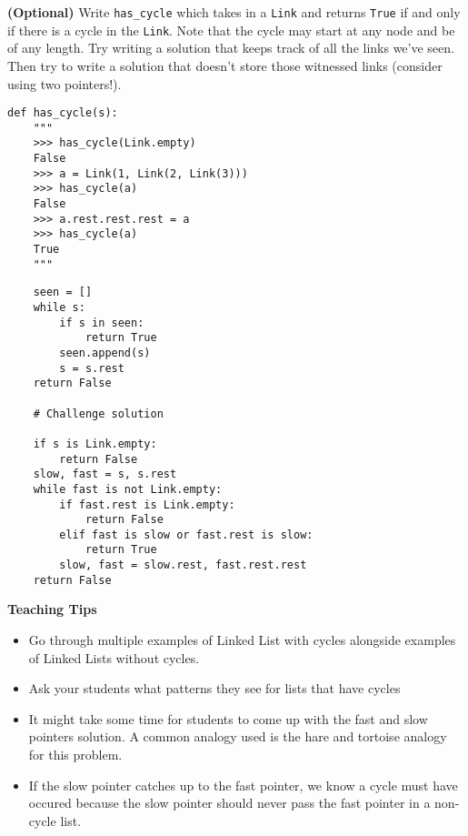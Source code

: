 \begin{blocksection}
\question \textbf{(Optional)} Write \lstinline{has_cycle} which takes in a
\lstinline{Link} and returns \lstinline{True} if and only if there is a cycle in the
\lstinline{Link}. Note that the cycle may start at any node and be of any length.
Try writing a solution that keeps track of all the links we've seen. Then try to
write a solution that doesn't store those witnessed links (consider using
two pointers!).

\begin{lstlisting}
def has_cycle(s):
    """
    >>> has_cycle(Link.empty)
    False
    >>> a = Link(1, Link(2, Link(3)))
    >>> has_cycle(a)
    False
    >>> a.rest.rest.rest = a
    >>> has_cycle(a)
    True
    """
\end{lstlisting}

\begin{solution}
\begin{lstlisting}
    seen = []
    while s:
        if s in seen:
            return True
        seen.append(s)
        s = s.rest
    return False

    # Challenge solution

    if s is Link.empty:
        return False
    slow, fast = s, s.rest
    while fast is not Link.empty:
        if fast.rest is Link.empty:
            return False
        elif fast is slow or fast.rest is slow:
            return True
        slow, fast = slow.rest, fast.rest.rest
    return False
\end{lstlisting}
\end{solution}

\begin{guide}
    \textbf{Teaching Tips}
    \begin{itemize}
       \item Go through multiple examples of Linked List with cycles alongside examples of Linked Lists without cycles.
       \item Ask your students what patterns they see for lists that have cycles
       \item It might take some time for students to come up with the fast and slow pointers solution. A common analogy used is the hare and tortoise analogy for this problem.
       \item If the slow pointer catches up to the fast pointer, we know a cycle must have occured because the slow pointer should never pass the fast pointer in a non-cycle list.
    \end{itemize}
 \end{guide}

\end{blocksection}